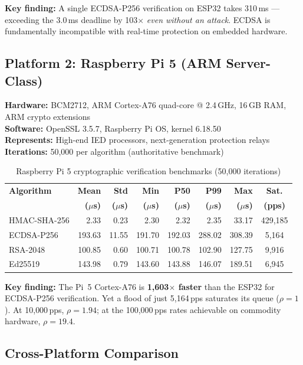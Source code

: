 \documentclass[11pt,a4paper]{article}
\begin{document}
\textbf{Key finding:} A single ECDSA-P256 verification on ESP32 takes 310\,ms --- exceeding the 3.0\,ms deadline by 103$\times$ \emph{even without an attack}. ECDSA is fundamentally incompatible with real-time protection on embedded hardware.

\subsection{Platform 2: Raspberry Pi 5 (ARM Server-Class)}

\textbf{Hardware:} BCM2712, ARM Cortex-A76 quad-core @ 2.4\,GHz, 16\,GB RAM, ARM crypto extensions\\
\textbf{Software:} OpenSSL 3.5.7, Raspberry Pi OS, kernel 6.18.50\\
\textbf{Represents:} High-end IED processors, next-generation protection relays\\
\textbf{Iterations:} 50{,}000 per algorithm (authoritative benchmark)

\begin{table}[H]
\centering
\caption{Raspberry Pi 5 cryptographic verification benchmarks (50{,}000 iterations)}
\label{tab:pi5}
\begin{tabular}{@{}lrrrrrrc@{}}
\toprule
\textbf{Algorithm} & \textbf{Mean} & \textbf{Std} & \textbf{Min} & \textbf{P50} & \textbf{P99} & \textbf{Max} & \textbf{Sat.}\\
& \textbf{($\mu$s)} & \textbf{($\mu$s)} & \textbf{($\mu$s)} & \textbf{($\mu$s)} & \textbf{($\mu$s)} & \textbf{($\mu$s)} & \textbf{(pps)} \\
\midrule
HMAC-SHA-256 & 2.33 & 0.23 & 2.30 & 2.32 & 2.35 & 33.17 & 429{,}185 \\
ECDSA-P256 & 193.63 & 11.55 & 191.70 & 192.03 & 288.02 & 308.39 & 5{,}164 \\
RSA-2048 & 100.85 & 0.60 & 100.71 & 100.78 & 102.90 & 127.75 & 9{,}916 \\
Ed25519 & 143.98 & 0.79 & 143.60 & 143.88 & 146.07 & 189.51 & 6{,}945 \\
\bottomrule
\end{tabular}
\end{table}

\textbf{Key finding:} The Pi~5 Cortex-A76 is \textbf{1{,}603$\times$ faster} than the ESP32 for ECDSA-P256 verification. Yet a flood of just 5{,}164\,pps saturates its queue ($\rho = 1$). At 10{,}000\,pps, $\rho = 1.94$; at the 100{,}000\,pps rates achievable on commodity hardware, $\rho = 19.4$.

\subsection{Cross-Platform Comparison}
\end{document}
